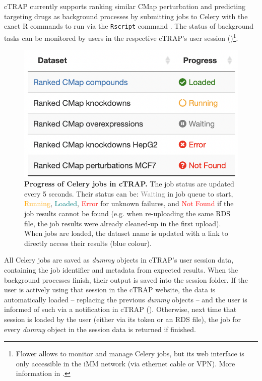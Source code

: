cTRAP currently supports ranking similar CMap perturbation and predicting targeting drugs as background processes by submitting jobs to Celery with the exact R commands to run via the \texttt{Rscript} command \cite{r-core-team:2021wf}. The status of background tasks can be monitored by users in the respective cTRAP's user session ()\footnote{Flower allows to monitor and manage Celery jobs, but its web interface is only accessible in the iMM network (via ethernet cable or VPN). More information in .}.

\begin{figure}[!h]
  \includegraphics[width=.5\textwidth]{images/ctrap/job-progress}
  \centering
  \caption[Progress of Celery jobs in cTRAP]{\textbf{Progress of Celery jobs in cTRAP.} The job status are updated every 5 seconds. Their status can be: \textcolor{gray}{Waiting} in job queue to start, \textcolor{orange}{Running}, \textcolor{teal}{Loaded}, \textcolor{red}{Error} for unknown failures, and \textcolor{red}{Not Found} if the job results cannot be found (e.g. when re-uploading the same RDS file, the job results were already cleaned-up in the first upload). When jobs are loaded, the dataset name is updated with a link to directly access their results (blue colour).}
  \label{fig:job-progress}
\end{figure}

All Celery jobs are saved as \emph{dummy} objects in cTRAP's user session data, containing the job identifier and metadata from expected results. When the background processes finish, their output is saved into the session folder. If the user is actively using that session in the cTRAP website, the data is automatically loaded -- replacing the previous \emph{dummy} objects -- and the user is informed of such via a notification in cTRAP (). Otherwise, next time that session is loaded by the user (either via its token or an RDS file), the job for every \emph{dummy} object in the session data is returned if finished.

